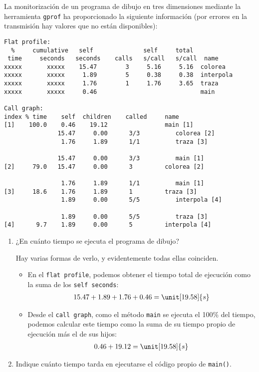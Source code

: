 \begin{ejercicio}
    La monitorización de un programa de dibujo en tres dimensiones mediante la herramienta \verb|gprof| ha proporcionado la siguiente información (por errores en la transmisión hay valores que no están disponibles):
    \begin{verbatim}
Flat profile:
  %     cumulative   self              self     total           
 time     seconds   seconds    calls   s/call   s/call  name    
xxxxx       xxxxx    15.47        3     5.16     5.16  colorea 
xxxxx       xxxxx     1.89        5     0.38     0.38  interpola
xxxxx       xxxxx     1.76        1     1.76     3.65  traza   
xxxxx       xxxxx     0.46                             main

Call graph:
index % time    self  children    called     name
[1]    100.0    0.46    19.12                main [1]
               15.47     0.00      3/3          colorea [2]
                1.76     1.89      1/1          traza [3]

               15.47     0.00      3/3          main [1]
[2]     79.0   15.47     0.00      3         colorea [2]
                
                1.76     1.89      1/1          main [1]
[3]     18.6    1.76     1.89      1         traza [3]
                1.89     0.00      5/5          interpola [4]
                
                1.89     0.00      5/5          traza [3]
[4]      9.7    1.89     0.00      5         interpola [4]
    \end{verbatim}
    \begin{enumerate}
        \item ¿En cuánto tiempo se ejecuta el programa de dibujo?
        
        Hay varias formas de verlo, y evidentemente todas ellas coinciden.
        \begin{itemize}
            \item En el \verb|flat profile|, podemos obtener el tiempo total de ejecución como la suma de los \verb|self seconds|:
            \begin{align*}
                15.47 + 1.89 + 1.76 + 0.46 = \unit[19.58]{s}
            \end{align*}
            \item Desde el \verb|call graph|, como el método \verb|main| se ejecuta el 100\% del tiempo, podemos calcular este tiempo como la suma de su tiempo propio de ejecución más el de sus hijos:
            \begin{align*}
                0.46 + 19.12 = \unit[19.58]{s}
            \end{align*}
        \end{itemize}
        \item Indique cuánto tiempo tarda en ejecutarse el código propio de \verb|main()|.


\end{enumerate}
\end{ejercicio}
